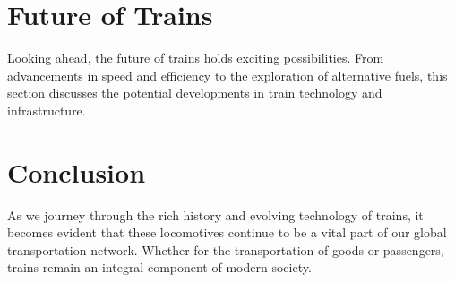 \documentclass[a4paper,12pt]{article}
\begin{document}
\section{Future of Trains}
Looking ahead, the future of trains holds exciting possibilities. From advancements in speed and efficiency to the exploration of alternative fuels, this section discusses the potential developments in train technology and infrastructure.

\section{Conclusion}
As we journey through the rich history and evolving technology of trains, it becomes evident that these locomotives continue to be a vital part of our global transportation network. Whether for the transportation of goods or passengers, trains remain an integral component of modern society.
\end{document}
